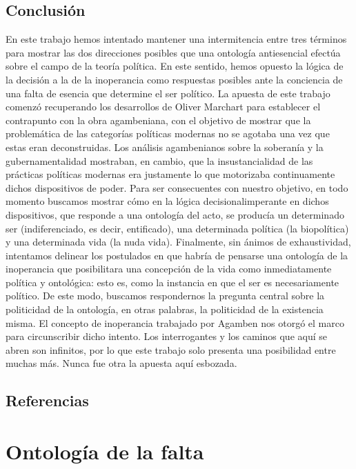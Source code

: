 \section{Conclusión}


En este trabajo hemos intentado mantener una intermitencia entre tres términos  para mostrar las dos direcciones posibles que una ontología antiesencial efectúa sobre el campo de la teoría política. En este sentido, hemos opuesto la lógica de la decisión a la de la inoperancia como respuestas posibles ante la conciencia de una falta de esencia que determine el ser político. La apuesta de este trabajo comenzó recuperando los desarrollos de Oliver Marchart para establecer el contrapunto con la obra agambeniana, con el objetivo de mostrar que la problemática de las categorías políticas modernas no se agotaba una vez que estas eran deconstruidas. Los análisis agambenianos sobre la soberanía y la gubernamentalidad mostraban, en cambio, que la insustancialidad de las prácticas políticas modernas era justamente lo que motorizaba continuamente dichos dispositivos de poder. Para ser consecuentes con nuestro objetivo, en todo momento buscamos mostrar cómo en la lógica decisionalimperante en dichos dispositivos, que responde a una ontología del acto, se producía un determinado ser (indiferenciado, es decir, entificado), una determinada política (la biopolítica) y una determinada vida (la nuda vida). Finalmente, sin ánimos de exhaustividad, intentamos delinear los postulados en que habría de pensarse una ontología de la inoperancia que posibilitara una concepción de la vida como inmediatamente política y ontológica: esto es, como la instancia en que el ser es necesariamente político. De este modo, buscamos respondernos la pregunta central sobre la politicidad de la ontología, en otras palabras, la politicidad de la existencia misma. El concepto de inoperancia trabajado por Agamben nos otorgó el marco para circunscribir dicho intento. Los interrogantes y los caminos que aquí se abren son infinitos, por lo que este trabajo solo presenta una posibilidad entre muchas más. Nunca fue otra la apuesta aquí esbozada.

\section*{Referencias}
\printbibliography[heading=none]   %


\chapter{Ontología de la falta}

